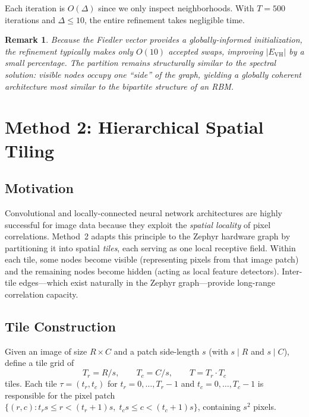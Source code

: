 \documentclass[11pt,a4paper]{article}
\newtheorem{remark}{Remark}
\begin{document}
Each iteration is $O(\Delta)$ since we only inspect neighborhoods.  With $T=500$ iterations and $\Delta\leq 10$, the entire refinement takes negligible time.

\begin{remark}
Because the Fiedler vector provides a globally-informed initialization, the refinement typically makes only $O(10)$ accepted swaps, improving $|E_{\mathrm{VH}}|$ by a small percentage.  The partition remains structurally similar to the spectral solution: visible nodes occupy one ``side'' of the graph, yielding a globally coherent architecture most similar to the bipartite structure of an RBM.
\end{remark}


\section{Method 2: Hierarchical Spatial Tiling}\label{sec:tiling}

\subsection{Motivation}

Convolutional and locally-connected neural network architectures are highly successful for image data because they exploit the \emph{spatial locality} of pixel correlations.  Method~2 adapts this principle to the Zephyr hardware graph by partitioning it into spatial \emph{tiles}, each serving as one local receptive field.  Within each tile, some nodes become visible (representing pixels from that image patch) and the remaining nodes become hidden (acting as local feature detectors).  Inter-tile edges---which exist naturally in the Zephyr graph---provide long-range correlation capacity.

\subsection{Tile Construction}\label{sec:tiles}

Given an image of size $R\times C$ and a patch side-length $s$ (with $s \mid R$ and $s \mid C$), define a tile grid of
\[
  T_r = R/s, \qquad T_c = C/s, \qquad T = T_r \cdot T_c
\]
tiles.  Each tile $\tau = (t_r, t_c)$ for $t_r=0,\ldots,T_r{-}1$ and $t_c=0,\ldots,T_c{-}1$ is responsible for the pixel patch $\{(r,c) : t_r s \leq r < (t_r+1)s,\; t_c s \leq c < (t_c+1)s\}$, containing $s^2$ pixels.
\end{document}
